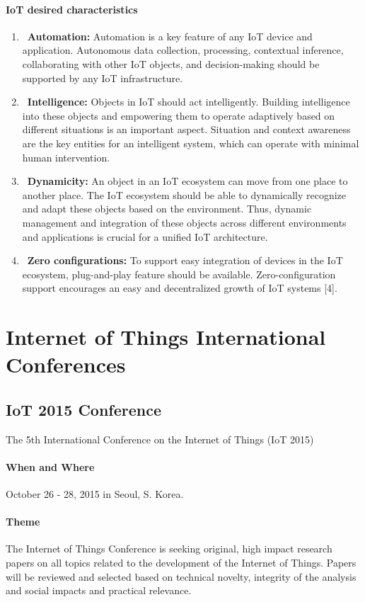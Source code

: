 \documentclass[12pt]{article}
\begin{document}
\paragraph {IoT desired characteristics}
\begin{enumerate}
\item\ \textbf {Automation:} Automation is a key feature of any IoT
device and application. Autonomous data collection, processing,
contextual inference, collaborating with other
IoT objects, and decision-making should be supported by
any IoT infrastructure.
\item\ \textbf {Intelligence:} Objects in IoT should act intelligently.
Building intelligence into these objects and empowering
them to operate adaptively based on different situations
is an important aspect. Situation and context awareness
are the key entities for an intelligent system, which can
operate with minimal human intervention.
\item\ \textbf {Dynamicity:} An object in an IoT ecosystem can move
from one place to another place. The IoT ecosystem
should be able to dynamically recognize and adapt these
objects based on the environment. Thus, dynamic management
and integration of these objects across different
environments and applications is crucial for a unified IoT
architecture.
\item\ \textbf {Zero configurations:} To support easy integration of
devices in the IoT ecosystem, plug-and-play feature
should be available. Zero-configuration support encourages
an easy and decentralized growth of IoT systems [4].
\end{enumerate}

\section{Internet of Things International Conferences}

\subsection {IoT 2015 Conference}
The 5th International Conference on the Internet of Things (IoT 2015) 

\paragraph{When and Where} October 26 - 28, 2015 in Seoul, S. Korea.

 \paragraph{Theme}The Internet of Things Conference is seeking original, high impact research papers on all topics related to the development of the Internet of Things. Papers will be reviewed and selected based on technical novelty, integrity of the analysis and social impacts and practical relevance.
\end{document}
